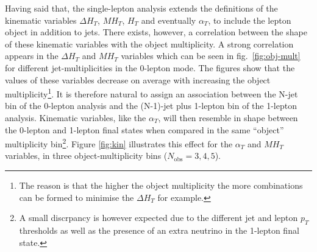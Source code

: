 Having said that, the single-lepton analysis extends the definitions of the kinematic variables $\Delta H_{T}$, $MH_{T}$, $H_{T}$ and eventually $\alpha_{T}$, to include the lepton object in addition to jets. There exists, however, a correlation between the shape of these kinematic variables with the object multiplicity. A strong correlation appears in the $\Delta H_{T}$ and $MH_{T}$ variables which can be seen in fig.~\ref{fig:obj-mult} for different jet-multiplicities in the 0-lepton mode. The figures show that the values of these variables decrease on average with increasing the object multiplicity\footnote{The reason is that the higher the object multiplicity the more combinations can be formed to minimise the $\Delta H_{T}$ for example.}. It is therefore natural to assign an association between the N-jet bin of the 0-lepton analysis and the (N-1)-jet plus 1-lepton bin of the 1-lepton analysis. Kinematic variables, like the $\alpha_{T}$, will then resemble in shape between the 0-lepton and 1-lepton final states when compared in the same ``object'' multiplicity bin\footnote{A small discrpancy is however expected due to the different jet and lepton $p_{T}$ thresholds as well as the presence of an extra neutrino in the 1-lepton final state.}. Figure \ref{fig:kin} illustrates this effect for the $\alpha_{T}$ and $MH_{T}$ variables, in three object-multiplicity bins ($N_{\textrm{obs}}=3,4,5$).


